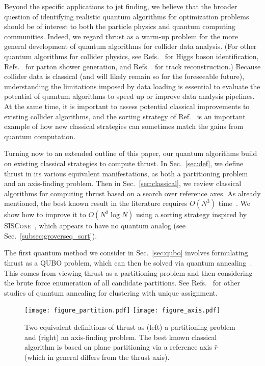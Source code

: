 \documentclass[aps,prd,twocolumn,superscriptaddress,preprintnumbers,nofootinbib,longbibliography,floatfix]{revtex4-1}
\DeclareRobustCommand{\Sec}[1]{Sec.~\ref{#1}}
\DeclareRobustCommand{\Ref}[1]{Ref.~\cite{#1}}
\DeclareRobustCommand{\Refs}[1]{Refs.~\cite{#1}}
\begin{document}
Beyond the specific applications to jet finding, we believe that the broader question of identifying realistic quantum algorithms for optimization problems should be of interest to both the particle physics and quantum computing communities.
%
Indeed, we regard thrust as a warm-up problem for the more general development of quantum algorithms for collider data analysis.
%
(For other quantum algorithms for collider physics, see \Refs{Mott:2017xdb,Zlokapa:2019lvv} for Higgs boson identification, \Refs{2019arXiv190108148P,Bauer:2019qxa} for parton shower generation, and \Refs{Shapoval:2019txi, Bapst:2019llh,Zlokapa:2019tkn} for track reconstruction.)
%
Because collider data is classical (and will likely remain so for the foreseeable future), understanding the limitations imposed by data loading is essential to evaluate the potential of quantum algorithms to speed up or improve data analysis pipelines.
%
At the same time, it is important to assess potential classical improvements to existing collider algorithms, and the sorting strategy of \Ref{Salam:2007xv} is an important example of how new classical strategies can sometimes match the gains from quantum computation.



Turning now to an extended outline of this paper, our quantum algorithms build on existing classical strategies to compute thrust.
%
In \Sec{sec:def}, we define thrust in its various equivalent manifestations, as both a partitioning problem and an axis-finding problem.
%
Then in \Sec{sec:classical}, we review classical algorithms for computing thrust based on a search over reference axes.
%
As already mentioned, the best known result in the literature requires $O(N^3)$ time~\cite{Yamamoto:1984fd}.
%
We show how to improve it to $O(N^2\log N)$ using a sorting strategy inspired by \textsc{SISCone}~\cite{Salam:2007xv}, which appears to have no quantum analog (see \Sec{subsec:groverseq_sort}).


The first quantum method we consider in \Sec{sec:qubo} involves formulating thrust as a \ac{QUBO} problem, which can then be solved via quantum annealing~\cite{PhysRevE.58.5355, 2000quant.ph..1106F}.
%
This comes from viewing thrust as a partitioning problem and then considering the brute force enumeration of all candidate partitions.
%
See \Refs{2018QuIP...17...39K,2018arXiv180302886N} for other studies of quantum annealing for clustering with unique assignment.


\begin{figure*}
\texttt{[image: figure\_partition.pdf]}
\texttt{[image: figure\_axis.pdf]}
\caption{Two equivalent definitions of thrust as (left) a partitioning problem and (right) an axis-finding problem.
%
The best known classical algorithm is based on plane partitioning via a reference axis $\hat{r}$ (which in general differs from the thrust axis).
}
\label{fig:thrust}
\end{figure*}
\end{document}

